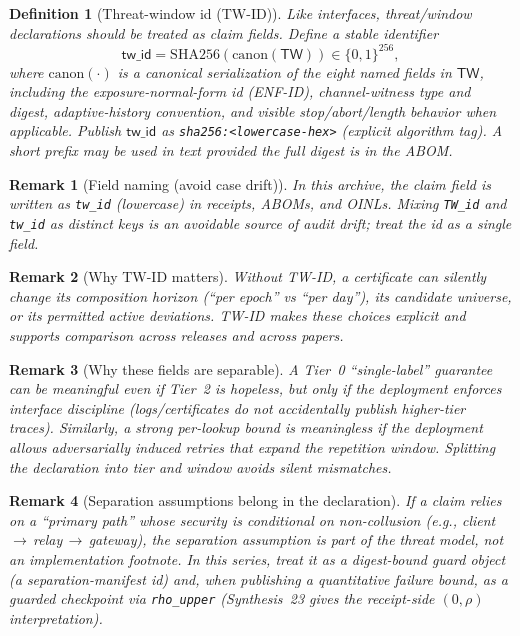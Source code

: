 \documentclass[11pt]{article}
\newtheorem{definition}{Definition}
\newtheorem{remark}{Remark}
\begin{document}
\begin{definition}[Threat-window id (TW-ID)]
Like interfaces, threat/window declarations should be treated as claim fields.
Define a stable identifier
\[
\mathsf{tw\_id}=\mathrm{SHA256}(\mathrm{canon}(\mathsf{TW}))\in\{0,1\}^{256},
\]
where $\mathrm{canon}(\cdot)$ is a canonical serialization of the eight named fields in $\mathsf{TW}$, including the exposure-normal-form id (ENF-ID), channel-witness type and digest, adaptive-history convention, and visible stop/abort/length behavior when applicable.
Publish $\mathsf{tw\_id}$ as \texttt{sha256:<lowercase-hex>} (explicit algorithm tag). A short prefix may be used in text provided the full digest is in the ABOM.
\end{definition}

\begin{remark}[Field naming (avoid case drift)]
In this archive, the claim field is written as \texttt{tw\_id} (lowercase) in receipts, ABOMs, and OINLs.
Mixing \texttt{TW\_id} and \texttt{tw\_id} as distinct keys is an avoidable source of audit drift; treat the id as a single field.
\end{remark}

\begin{remark}[Why TW-ID matters]
Without TW-ID, a certificate can silently change its composition horizon (``per epoch'' vs ``per day''), its candidate universe, or its permitted active deviations.
TW-ID makes these choices explicit and supports comparison across releases and across papers.
\end{remark}

\begin{remark}[Why these fields are separable]
A Tier~0 ``single-label'' guarantee can be meaningful even if Tier~2 is hopeless, but only if the deployment enforces interface discipline (logs/certificates do not accidentally publish higher-tier traces).
Similarly, a strong per-lookup bound is meaningless if the deployment allows adversarially induced retries that expand the repetition window.
Splitting the declaration into \emph{tier} and \emph{window} avoids silent mismatches.
\end{remark}

\begin{remark}[Separation assumptions belong in the declaration]
If a claim relies on a ``primary path'' whose security is conditional on non-collusion (e.g., client\,$\to$\,relay\,$\to$\,gateway), the separation assumption is part of the threat model, not an implementation footnote.
In this series, treat it as a digest-bound guard object (a separation-manifest id) and, when publishing a quantitative failure bound, as a guarded checkpoint via \texttt{rho\_upper} (Synthesis~23 gives the receipt-side $(0,\rho)$ interpretation). \cite{series:primarysepmanifest,series:probsep}
\end{remark}
\end{document}
